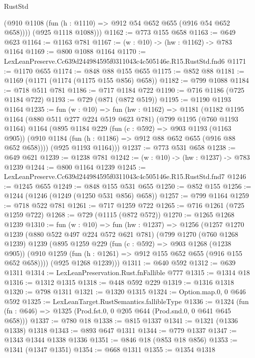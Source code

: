 \begin{lexlean}{RustStd}
\begin{coremodule}
          (@910 @1108 (fun (h : @1110) => @912 @54 @652 @655 (@916 @54 @652 @658))))
        (@925 @1118 @1088)))
@1162 := @773 @155 @658
@1163 := @649 @623
@1164 := @1163 @781
@1167 := (w : @10) -> (hw : @1162) -> @783 @1164
@1169 := @800 @1088 @1164
@1170 := LexLeanPreserve.Cc639d244984595f0311043c4c505146e.R15.RustStd.fnd6
@1171 := @1170 @655
@1174 := @848 @88 @155 @655
@1175 := @852 @88
@1181 := @1169 (@1171 (@1174 (@1175 @155 @856) @658))
@1182 := @799 @1088
@1184 := @718 @511 @781
@1186 := @717 @1184 @722
@1190 := @716 @1186 (@725 @1184 @722)
@1193 := @729 (@871 (@872 @519))
@1195 := @1190 @1193 @1164
@1235 := fun (w : @10) =>
  fun (hw : @1162) =>
  @1181
    (@1182
      @1195
      @1164
      (@880 @511 @277 @224 @519 @623 @781)
      (@799
        @1195
        (@760 @1193 @1164)
        @1164
        (@895
          @1184
          @229
          (fun (c : @592) => @903 @1193 (@1163 @905))
          (@910 @1184 (fun (h : @1186) => @912 @88 @652 @655 (@916 @88 @652 @658))))
        (@925 @1193 @1164)))
@1237 := @773 @531 @658
@1238 := @649 @621
@1239 := @1238 @781
@1242 := (w : @10) -> (hw : @1237) -> @783 @1239
@1244 := @800 @1164 @1239
@1245 := LexLeanPreserve.Cc639d244984595f0311043c4c505146e.R15.RustStd.fnd7
@1246 := @1245 @655
@1249 := @848 @155 @531 @655
@1250 := @852 @155
@1256 := @1244 (@1246 (@1249 (@1250 @531 @856) @658))
@1257 := @799 @1164
@1259 := @718 @522 @781
@1261 := @717 @1259 @722
@1265 := @716 @1261 (@725 @1259 @722)
@1268 := @729 (@1115 (@872 @572))
@1270 := @1265 @1268 @1239
@1310 := fun (w : @10) =>
  fun (hw : @1237) =>
  @1256
    (@1257
      @1270
      @1239
      (@880 @522 @497 @224 @572 @621 @781)
      (@799
        @1270
        (@760 @1268 @1239)
        @1239
        (@895
          @1259
          @229
          (fun (c : @592) => @903 @1268 (@1238 @905))
          (@910 @1259 (fun (h : @1261) => @912 @155 @652 @655 (@916 @155 @652 @658))))
        (@925 @1268 @1239)))
@1311 := @640 @592
@1312 := @639 @1311
@1314 := LexLeanPreservation.Rust.fnFallible @777
@1315 := @1314 @18
@1316 := @1312 @1315
@1318 := @448 @592 @229
@1319 := @1316 @1318
@1320 := @798 @1311
@1321 := @1320 @1315
@1324 := Option.map.{0, 0} @646 @592
@1325 := LexLeanTarget.RustSemantics.fallibleType
@1336 := @1324
    (fun (fn : @646) => @1325 (Prod.fst.{0, 0} @205 @644 (Prod.snd.{0, 0} @641 @645 @658)))
@1337 := @780 @18
@1338 := @815 @1337
@1341 := @1321 (@1336 @1338) @1318
@1343 := @893 @647 @1311
@1344 := @779 @1337
@1347 := @1343 @1344 @1338 @1336
@1351 := @846 @18 (@853 @18 @856)
@1353 := @1341 (@1347 @1351)
@1354 := @668 @1311
@1355 := @1354 @1318

\end{coremodule}
\end{lexlean}
